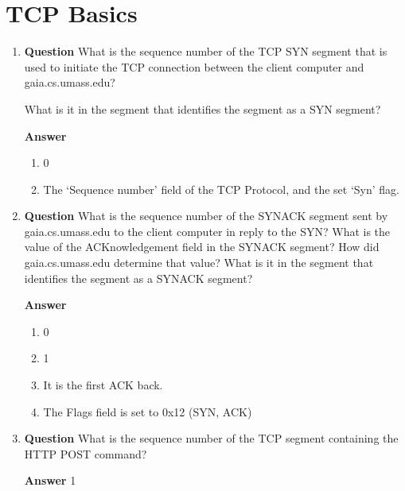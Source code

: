 \documentclass[12pt,letterpaper]{article}
\newcommand{\q}{\textbf{Question} }
\newcommand{\ans}{\textbf{Answer} }
\begin{document}
\section{TCP Basics}
\begin{enumerate}[resume]
\item \q What is the sequence number of the TCP SYN segment that is used to
initiate the TCP connection between the client computer and gaia.cs.umass.edu?

What is it in the segment that identifies the segment as a SYN segment?  

\ans
\begin{enumerate}
    \item 0
    \item The `Sequence number' field of the TCP Protocol, and the set `Syn'
        flag.
\end{enumerate}



\item \q What is the sequence number of the SYNACK segment sent by
gaia.cs.umass.edu to the client computer in reply to the SYN?  What is the
value of the ACKnowledgement field in the SYNACK segment?  How did
gaia.cs.umass.edu determine that value? What is it in the segment that
identifies the segment as a SYNACK segment? 

\ans
\begin{enumerate}
    \item 0
    \item 1
    \item It is the first ACK back.
    \item The Flags field is set to 0x12 (SYN, ACK)
\end{enumerate}



\item \q What is the sequence number of the TCP segment containing the HTTP
POST command?

\ans 1




\end{enumerate}
\end{document}
